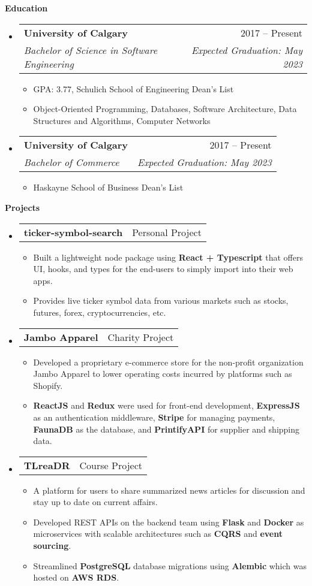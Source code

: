 \documentclass[letterpaper,12pt]{article}[leftmargin=*]
\makeatletter
\def \entryspacing {-0pt}
\renewcommand{\section}[2]{\vspace{5pt}
  \colorbox{secondary}{\color{white}\raggedbottom\normalsize\textbf{{#1}{\hspace{7pt}#2}}}
}
\newcommand{\resumeEntryStart}{\begin{itemize}[leftmargin=2.5mm]}
\newcommand{\resumeEntryEnd}{\end{itemize}\vspace{\entryspacing}}
\newcommand{\resumeItemListStart}{\begin{itemize}[leftmargin=4.5mm]}
\newcommand{\resumeItemListEnd}{\end{itemize}}
\newcommand{\resumeItem}[1]{
  \item\small{
    {#1 \vspace{-2pt}}
  }
}
\newcommand{\resumeEntryTSDL}[4]{
  \vspace{-1pt}\item[]
    \begin{tabularx}{0.97\textwidth}{X@{\hspace{60pt}}r}
      \textbf{\color{primary}#1} & {\firabook\color{accent}\small#2} \\
      \textit{\color{accent}\small#3} & \textit{\color{accent}\small#4} \\
    \end{tabularx}\vspace{-6pt}
}
\newcommand{\resumeEntryTD}[2]{
  \vspace{-1pt}\item[]
    \begin{tabularx}{0.97\textwidth}{X@{\hspace{60pt}}r}
      \textbf{\color{primary}#1} & {\firabook\color{accent}\small#2} \\
    \end{tabularx}\vspace{-6pt}
}
\makeatother
\begin{document}
\section{\faGraduationCap}{Education}

  \resumeEntryStart
    \resumeEntryTSDL
      {University of Calgary}{2017 -- Present}
      {Bachelor of Science in Software Engineering}{Expected Graduation: May 2023}
        \resumeItemListStart
            \resumeItem {GPA: 3.77, Schulich School of Engineering Dean’s List}
            \resumeItem {Object-Oriented Programming, Databases, Software Architecture, Data Structures and Algorithms, Computer Networks}
        \resumeItemListEnd
  \resumeEntryEnd
  
  \resumeEntryStart
    \resumeEntryTSDL
      {University of Calgary}{2017 -- Present}
      {Bachelor of Commerce}{Expected Graduation: May 2023}
      \resumeItemListStart
            \resumeItem {Haskayne School of Business Dean’s List}
        \resumeItemListEnd
  \resumeEntryEnd

\section{\faFlask}{Projects}

  \resumeEntryStart
    \resumeEntryTD
      {ticker-symbol-search}{Personal Project}
    \resumeItemListStart
      \resumeItem {Built a lightweight node package using {\bf React + Typescript} that offers UI, hooks, and types for the end-users to
simply import into their web apps.}
        \resumeItem {Provides live ticker symbol data from various markets such as stocks, futures, forex, cryptocurrencies, etc.}
    \resumeItemListEnd
  \resumeEntryEnd

  \resumeEntryStart
    \resumeEntryTD
      {Jambo Apparel}{Charity Project}
    \resumeItemListStart
      \resumeItem {Developed a proprietary e-commerce store for the non-profit organization Jambo Apparel to lower operating costs
incurred by platforms such as Shopify.}
        \resumeItem {{\bf ReactJS} and {\bf Redux} were used for front-end development, {\bf ExpressJS} as an authentication middleware, {\bf Stripe} for
managing payments, {\bf FaunaDB} as the database, and {\bf PrintifyAPI} for supplier and shipping data.}
    \resumeItemListEnd
  \resumeEntryEnd

  \resumeEntryStart
    \resumeEntryTD
      {TLreaDR}{Course Project}
    \resumeItemListStart
      \resumeItem {A platform for users to share summarized news articles for discussion and stay up to date on current affairs.}
      \resumeItem {Developed REST APIs on the backend team using {\bf Flask} and {\bf Docker} as microservices with scalable architectures such
as {\bf CQRS} and {\bf event sourcing}.}
      \resumeItem {Streamlined {\bf PostgreSQL} database migrations using {\bf Alembic} which was hosted on {\bf AWS RDS}.}
    \resumeItemListEnd
  \resumeEntryEnd
\end{document}
